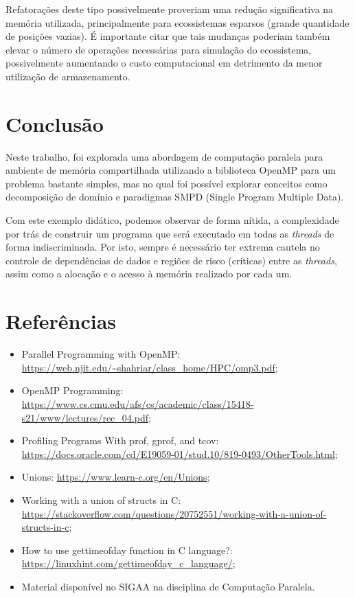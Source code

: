 \documentclass[a4paper, 12pt]{article}
\begin{document}
Refatorações deste tipo possivelmente proveriam uma redução significativa na memória utilizada, principalmente para ecossistemas esparsos (grande quantidade de posições vazias). É importante citar que tais mudanças poderiam também elevar o número de operações necessárias para simulação do ecossistema, possivelmente aumentando o custo computacional em detrimento da menor utilização de armazenamento.

\section{Conclusão}

Neste trabalho, foi explorada uma abordagem de computação paralela para ambiente de memória compartilhada utilizando a biblioteca OpenMP para um problema bastante simples, mas no qual foi possível explorar conceitos como decomposição de domínio e paradigmas SMPD (Single Program Multiple Data).

Com este exemplo didático, podemos observar de forma nítida, a complexidade por trás de construir um programa que será executado em todas as \emph{threads} de forma indiscriminada. Por isto, sempre é necessário ter extrema cautela no controle de dependências de dados e regiões de risco (críticas) entre as \emph{threads}, assim como a alocação e o acesso à memória realizado por cada um.

\pagebreak
\section*{Referências}

\begin{itemize}
    \item Parallel Programming with OpenMP: \url{https://web.njit.edu/~shahriar/class_home/HPC/omp3.pdf};
    \item OpenMP Programming: \url{https://www.cs.cmu.edu/afs/cs/academic/class/15418-s21/www/lectures/rec_04.pdf};
    \item Profiling Programs With prof, gprof, and tcov: \url{https://docs.oracle.com/cd/E19059-01/stud.10/819-0493/OtherTools.html};
    \item Unions: \url{https://www.learn-c.org/en/Unions};
    \item Working with a union of structs in C: \url{https://stackoverflow.com/questions/20752551/working-with-a-union-of-structs-in-c};
    \item How to use gettimeofday function in C language?: \url{https://linuxhint.com/gettimeofday_c_language/};
    \item Material disponível no SIGAA na disciplina de Computação Paralela.
\end{itemize}
\end{document}
